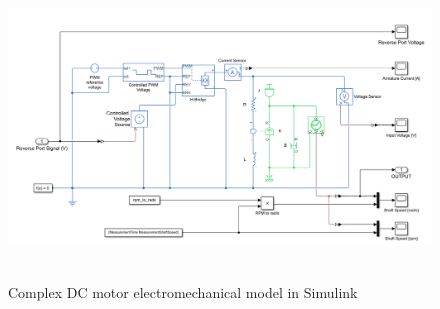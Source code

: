 \documentclass[12pt,english]{article}
\begin{document}
\begin{figure}[htb!]
	\centering
	\includegraphics[height=8cm]{figures/simulink_dc_motor_complex.png}
	\caption{Complex DC motor electromechanical model in Simulink}
	\label{simulink_dc_motor_complex}
\end{figure}
\end{document}
